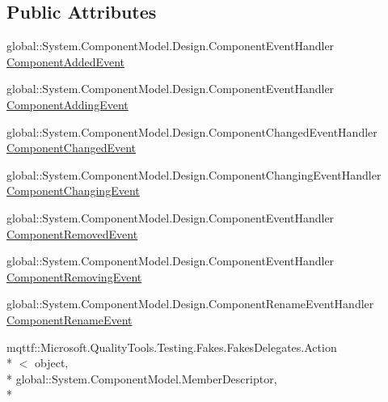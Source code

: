 \subsection*{Public Attributes}
\begin{DoxyCompactItemize}
\item 
global\-::\-System.\-Component\-Model.\-Design.\-Component\-Event\-Handler \hyperlink{class_system_1_1_component_model_1_1_design_1_1_fakes_1_1_stub_i_component_change_service_a720ebffe2805addc7e33b1748a4832e4}{Component\-Added\-Event}
\item 
global\-::\-System.\-Component\-Model.\-Design.\-Component\-Event\-Handler \hyperlink{class_system_1_1_component_model_1_1_design_1_1_fakes_1_1_stub_i_component_change_service_a60f00e8c76fb25e47019489627f8705b}{Component\-Adding\-Event}
\item 
global\-::\-System.\-Component\-Model.\-Design.\-Component\-Changed\-Event\-Handler \hyperlink{class_system_1_1_component_model_1_1_design_1_1_fakes_1_1_stub_i_component_change_service_a4b6e1766dd4f3bacb0d83f8c45ad3cd9}{Component\-Changed\-Event}
\item 
global\-::\-System.\-Component\-Model.\-Design.\-Component\-Changing\-Event\-Handler \hyperlink{class_system_1_1_component_model_1_1_design_1_1_fakes_1_1_stub_i_component_change_service_a7656ea5ebbbc522ce3daef74b8492174}{Component\-Changing\-Event}
\item 
global\-::\-System.\-Component\-Model.\-Design.\-Component\-Event\-Handler \hyperlink{class_system_1_1_component_model_1_1_design_1_1_fakes_1_1_stub_i_component_change_service_a62cccddf32a9aea32f00d26ad84abf9b}{Component\-Removed\-Event}
\item 
global\-::\-System.\-Component\-Model.\-Design.\-Component\-Event\-Handler \hyperlink{class_system_1_1_component_model_1_1_design_1_1_fakes_1_1_stub_i_component_change_service_a7690b6dfbcc006d5a45153dd30a72b81}{Component\-Removing\-Event}
\item 
global\-::\-System.\-Component\-Model.\-Design.\-Component\-Rename\-Event\-Handler \hyperlink{class_system_1_1_component_model_1_1_design_1_1_fakes_1_1_stub_i_component_change_service_abdcbf82d8de31bd5dbd044efa6953d3f}{Component\-Rename\-Event}
\item 
mqttf\-::\-Microsoft.\-Quality\-Tools.\-Testing.\-Fakes.\-Fakes\-Delegates.\-Action\\*
$<$ object, \\*
global\-::\-System.\-Component\-Model.\-Member\-Descriptor, \\*

\end{DoxyCompactItemize}
